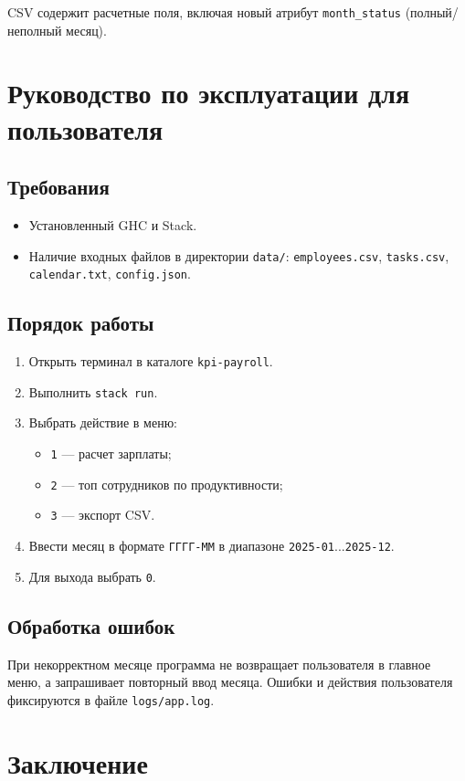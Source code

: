 \documentclass[a4paper,14pt]{extarticle}
\begin{document}
CSV содержит расчетные поля, включая новый атрибут \texttt{month\_status} (полный/неполный месяц).

\section{Руководство по эксплуатации для пользователя}

\subsection{Требования}
\begin{itemize}
  \item Установленный GHC и Stack.
  \item Наличие входных файлов в директории \texttt{data/}:
  \texttt{employees.csv}, \texttt{tasks.csv}, \texttt{calendar.txt}, \texttt{config.json}.
\end{itemize}

\subsection{Порядок работы}
\begin{enumerate}
  \item Открыть терминал в каталоге \texttt{kpi-payroll}.
  \item Выполнить \texttt{stack run}.
  \item Выбрать действие в меню:
  \begin{itemize}
    \item \texttt{1} --- расчет зарплаты;
    \item \texttt{2} --- топ сотрудников по продуктивности;
    \item \texttt{3} --- экспорт CSV.
  \end{itemize}
  \item Ввести месяц в формате \texttt{ГГГГ-ММ} в диапазоне \texttt{2025-01}...\texttt{2025-12}.
  \item Для выхода выбрать \texttt{0}.
\end{enumerate}

\subsection{Обработка ошибок}
При некорректном месяце программа не возвращает пользователя в главное меню, а запрашивает повторный ввод месяца. Ошибки и действия пользователя фиксируются в файле \texttt{logs/app.log}.

\section*{Заключение}
\end{document}
